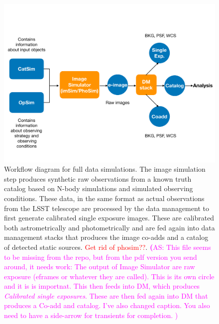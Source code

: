 \documentclass[twocolumn]{aastex62}
\newcommand{\as}[1]{{\textcolor{magenta}{{\textbf (AS: #1)}}}}
\begin{document}
\begin{figure}
\centering
 \includegraphics[trim={0cm 1.25cm 0cm 4.05cm}, clip, width=1.0\columnwidth]{dc1_workflow}
\caption{Workflow diagram for full data simulations. The image simulation step produces synthetic raw observations from a known truth catalog based on N-body simulations and simulated observing conditions. These data, in the same format as actual observations from the LSST telescope are processed by the data management to first generate calibrated single exposure images. These are calibrated both astrometrically and photometrically and are fed again into data management stacks that produces the image co-adds and a catalog of detected static sources.  \textcolor{red}{Get rid of phosim??}.
  \as{This file seems to be missing from the repo, but from the pdf version
    you send around, it needs work: The output of Image Simulator are raw exposure (eframes or whatever they are called). This is its own circle and it is is importnat. This then feeds into DM, which produces \emph{Calibrated single exposures}. These are then fed again into DM that produces a Co-add and catalog. I've also changed caption. You also need to have a side-arrow for transients for completion. }
}

\label{fig:dc1_workflow}
\end{figure}
\end{document}
